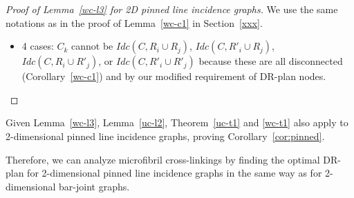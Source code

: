 \begin{proof}[Proof of Lemma~\ref{wc-l3} for 2D pinned line incidence graphs]
We use the same notations as in the proof of Lemma~\ref{wc-c1} in Section~\ref{xxx}.
\begin{itemize}
    \item 4 cases: $C_k$ cannot be $Idc(C,R_i\cup R_j)$, $Idc(C,R'_i\cup R_j)$, $Idc(C,R_i\cup R'_j)$, or $Idc(C,R'_i\cup R'_j)$ because these are all disconnected (Corollary~\ref{wc-c1}) and by our modified requirement of DR-plan nodes.

%
%
\end{itemize}


\end{proof}


Given Lemma~\ref{wc-l3}, Lemma~\ref{uc-l2}, Theorem~\ref{uc-t1} and \ref{wc-t1} also apply to  2-dimensional pinned line incidence graphs,
proving Corollary~\ref{cor:pinned}. 

Therefore, we can analyze microfibril cross-linkings by finding the optimal DR-plan for  2-dimensional pinned line incidence graphs in the same way as for 2-dimensional bar-joint graphs.
 


